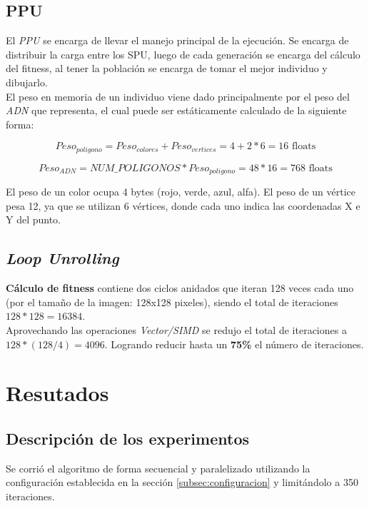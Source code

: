\documentclass[11pt, spanish]{article}
\begin{document}
\subsection{PPU}
El \emph{PPU} se encarga de llevar el manejo principal de la
ejecución. Se encarga de distribuir la carga entre los SPU, luego de
cada generación se encarga del cálculo del fitness, al tener la
población se encarga de tomar el mejor individuo y dibujarlo.\\

El peso en memoria de un individuo viene dado principalmente por el
peso del \emph{ADN} que representa, el cual puede ser estáticamente
calculado de la siguiente forma:

$$ Peso_{poligono} = Peso_{colores} + Peso_{vertices} = 4 + 2*6 = 16\textrm{ floats} $$

$$ Peso_{ADN} = NUM\_POLIGONOS * Peso_{poligono} = 48 * 16 = 768\textrm{ floats} $$

El peso de un color ocupa 4 bytes (rojo, verde, azul, alfa). El peso
de un vértice pesa 12, ya que se utilizan 6 vértices, donde cada uno
indica las coordenadas X e Y del punto.

\subsection{\emph{Loop Unrolling}}
\textbf{Cálculo de fitness} contiene dos ciclos anidados que iteran
128 veces cada uno (por el tamaño de la imagen: 128x128 pixeles),
siendo el total de iteraciones $128 * 128 = 16384$.\\

Aprovechando las operaciones \emph{Vector/SIMD} se redujo el total de
iteraciones a $128 * (128/4) = 4096$. Logrando reducir hasta un
\textbf{75\%} el número de iteraciones.

\section{Resutados}
\label{sec:resultados}

\subsection{Descripción de los experimentos}
\label{sec:desc-experimentos}
Se corrió el algoritmo de forma secuencial y paralelizado utilizando
la configuración establecida en la sección \ref{subsec:configuracion} y
limitándolo a 350 iteraciones.\\
\end{document}
